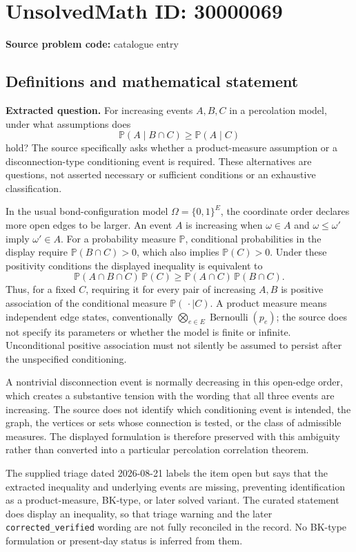 \documentclass[11pt]{article}
\begin{document}
\section*{UnsolvedMath ID: 30000069}
\textbf{Source problem code:} catalogue entry
\subsection{Definitions and mathematical statement}
\textbf{Extracted question.} For increasing events \(A,B,C\) in a percolation model, under what assumptions does\[\mathbb P(A\mid B\cap C)\ge\mathbb P(A\mid C)\] hold? The source specifically asks whether a product-measure assumption or a disconnection-type conditioning event is required. These alternatives are questions, not asserted necessary or sufficient conditions or an exhaustive classification.\par In the usual bond-configuration model \(\Omega=\{0,1\}^{E}\), the coordinate order declares more open edges to be larger. An event \(A\) is increasing when \(\omega\in A\) and \(\omega\le\omega'\) imply \(\omega'\in A\). For a probability measure \(\mathbb P\), conditional probabilities in the display require \(\mathbb P(B\cap C)>0\), which also implies \(\mathbb P(C)>0\). Under these positivity conditions the displayed inequality is equivalent to\[\mathbb P(A\cap B\cap C)\,\mathbb P(C)\ge\mathbb P(A\cap C)\,\mathbb P(B\cap C).\] Thus, for a fixed \(C\), requiring it for every pair of increasing \(A,B\) is positive association of the conditional measure \(\mathbb P(\,\cdot\mid C)\). A product measure means independent edge states, conventionally \(\bigotimes_{e\in E}\operatorname{Bernoulli}(p_e)\); the source does not specify its parameters or whether the model is finite or infinite. Unconditional positive association must not silently be assumed to persist after the unspecified conditioning.\par A nontrivial disconnection event is normally decreasing in this open-edge order, which creates a substantive tension with the wording that all three events are increasing. The source does not identify which conditioning event is intended, the graph, the vertices or sets whose connection is tested, or the class of admissible measures. The displayed formulation is therefore preserved with this ambiguity rather than converted into a particular percolation correlation theorem.\par The supplied triage dated 2026-08-21 labels the item open but says that the extracted inequality and underlying events are missing, preventing identification as a product-measure, BK-type, or later solved variant. The curated statement does display an inequality, so that triage warning and the later \texttt{corrected\_verified} wording are not fully reconciled in the record. No BK-type formulation or present-day status is inferred from them.
\end{document}
